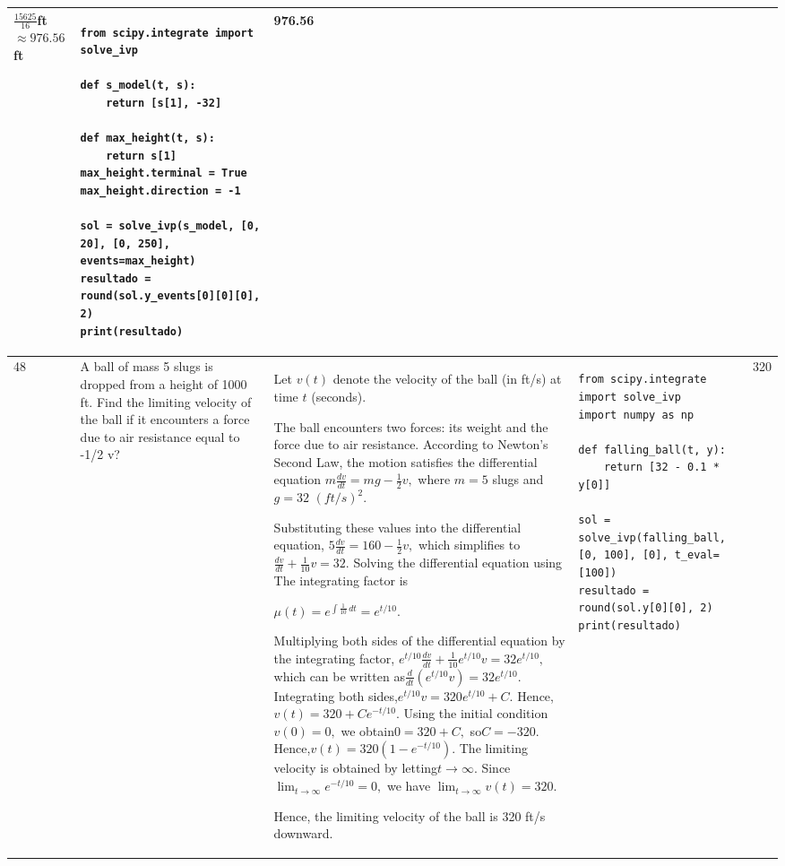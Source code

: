 \documentclass[a4paper,12pt]{article}
\begin{document}
\begin{longtable}{|p{0.3cm}|p{}|p{10cm}|p{}|p{1.5cm}|}
$\frac{15625}{16}$ft$\approx976.56 $ft


 &\begin{verbatim}
from scipy.integrate import solve_ivp

def s_model(t, s):
    return [s[1], -32]

def max_height(t, s):
    return s[1]
max_height.terminal = True
max_height.direction = -1

sol = solve_ivp(s_model, [0, 20], [0, 250], events=max_height)
resultado = round(sol.y_events[0][0][0], 2)
print(resultado)
\end{verbatim}& 976.56  \\ \hline 
  48           & A ball of mass 5 slugs is dropped from a height of 1000 ft. Find the limiting velocity of the ball if it encounters a force due to air resistance equal to -1/2 v?


              &Let $v(t)$ denote the velocity of the ball (in ft/s) at time $t$ (seconds).

The ball encounters two forces: its weight and the force due to air resistance. According to Newton's Second Law, the motion satisfies the differential equation
$m\frac{dv}{dt}=mg-\frac12v,$
where $m=5$ slugs and $g=32$ $(ft/s)^2$.

Substituting these values into the differential equation,
$5\frac{dv}{dt}=160-\frac12v,$
which simplifies to
$\frac{dv}{dt}+\frac1{10}v=32.$
Solving the differential equation using
The integrating factor is

$\mu(t)=e^{\int\frac1{10}\,dt}=e^{t/10}.$

Multiplying both sides of the differential equation by the integrating factor,
$e^{t/10}\frac{dv}{dt}
+\frac1{10}e^{t/10}v=32e^{t/10},$
which can be written as$
\frac{d}{dt}\left(e^{t/10}v\right)
=32e^{t/10}.$
Integrating both sides,$e^{t/10}v
=320e^{t/10}+C.$
Hence,$v(t)=320+Ce^{-t/10}.$
Using the initial condition
$v(0)=0,$
we obtain$0=320+C,$
so$C=-320.$
Hence,$v(t)=320\left(1-e^{-t/10}\right).$
The limiting velocity is obtained by letting$t\to\infty.$
Since$\lim_{t\to\infty}e^{-t/10}=0,$
we have $\lim_{t\to\infty}v(t)=320.$

Hence, the limiting velocity of the ball is 320 ft/s downward.


 &\begin{verbatim}
from scipy.integrate import solve_ivp
import numpy as np

def falling_ball(t, y):
    return [32 - 0.1 * y[0]]

sol = solve_ivp(falling_ball, [0, 100], [0], t_eval=[100])
resultado = round(sol.y[0][0], 2)
print(resultado)
\end{verbatim}& 320  \\ \hline 


\end{longtable}
\end{document}
